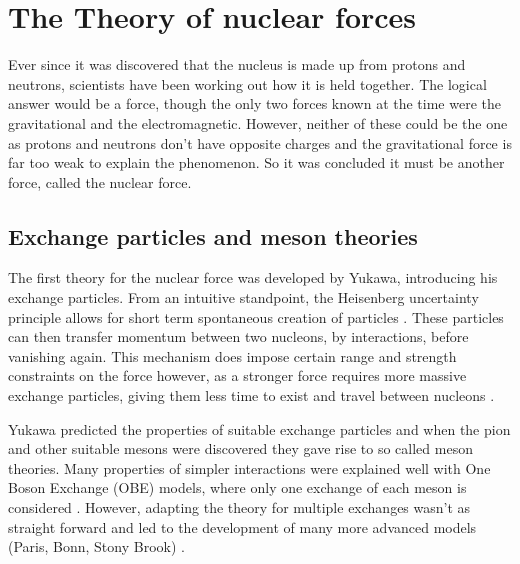 \section{The Theory of nuclear forces}
Ever since it was discovered that the nucleus is made up from protons and neutrons, scientists have been working out how it is held together.
The logical answer would be a force, though the only two forces known at the time were the gravitational and the electromagnetic.
However, neither of these could be the one as protons and neutrons don't have opposite charges and the gravitational force is far too weak to explain the phenomenon.
So it was concluded it must be another force, called the nuclear force. \cite{hergert_guided_2020, machleidt_chiral_2011}


\subsection{Exchange particles and meson theories}
The first theory for the nuclear force was developed by Yukawa, introducing his exchange particles.
From an intuitive standpoint, the Heisenberg uncertainty principle allows for short term spontaneous creation of particles \cite{machleidt_nuclear_2013}.
These particles can then transfer momentum between two nucleons, by interactions, before vanishing again.
This mechanism does impose certain range and strength constraints on the force however, as a stronger force requires more massive exchange particles, giving them less time to exist and travel between nucleons \cite{machleidt_nuclear_2013, hergert_guided_2020}.

Yukawa predicted the properties of suitable exchange particles and when the pion and other suitable mesons were discovered they gave rise to so called meson theories. %
Many properties of simpler interactions were explained well with One Boson Exchange (OBE) models, where only one exchange of each meson is considered \cite{machleidt_nuclear_2013}.
However, adapting the theory for multiple exchanges wasn't as straight forward and led to the development of many more advanced models (Paris, Bonn, Stony Brook) \cite{machleidt_nuclear_2013, machleidt_meson_1989}.

